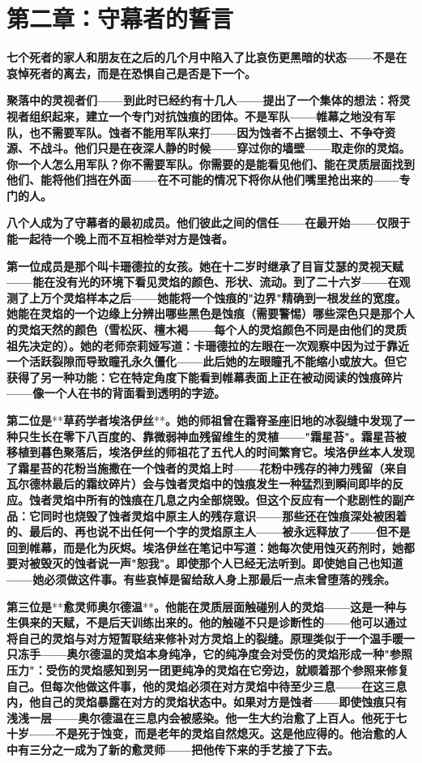 \documentclass[12pt,a4paper,openany]{ctexbook}
\begin{document}
\section*{第二章：守幕者的誓言}


\textbf{七个死者的家人和朋友在之后的几个月中陷入了比哀伤更黑暗的状态——不是在哀悼死者的离去，而是在恐惧自己是否是下一个。}


\textbf{聚落中的灵视者们——到此时已经约有十几人——提出了一个集体的想法：将灵视者组织起来，建立一个专门对抗蚀痕的团体。不是军队——帷幕之地没有军队，也不需要军队。蚀者不能用军队来打——因为蚀者不占据领土、不争夺资源、不战斗。他们只是在夜深人静的时候——穿过你的墙壁——取走你的灵焰。你一个人怎么用军队？你不需要军队。你需要的是能看见他们、能在灵质层面找到他们、能将他们挡在外面——在不可能的情况下将你从他们嘴里抢出来的——专门的人。}


\textbf{八个人成为了守幕者的最初成员。他们彼此之间的信任——在最开始——仅限于能一起待一个晚上而不互相检举对方是蚀者。}


\textbf{第一位成员是那个叫卡珊德拉的女孩。她在十二岁时继承了目盲艾瑟的灵视天赋——能在没有光的环境下看见灵焰的颜色、形状、流动。到了二十六岁——在观测了上万个灵焰样本之后——她能将一个蚀痕的"边界"精确到一根发丝的宽度。她能在灵焰的一个边缘上分辨出哪些黑色是蚀痕（需要警惕）哪些深色只是那个人的灵焰天然的颜色（雪松灰、檀木褐——每个人的灵焰颜色不同是由他们的灵质祖先决定的）。她的老师奈莉娅写道：卡珊德拉的左眼在一次观察中因为过于靠近一个活跃裂隙而导致瞳孔永久僵化——此后她的左眼瞳孔不能缩小或放大。但它获得了另一种功能：它在特定角度下能看到帷幕表面上正在被动阅读的蚀痕碎片——像一个人在书的背面看到透明的字迹。}


\textbf{第二位是}**\textbf{草药学者埃洛伊丝}**\textbf{。她的师祖曾在霜脊圣座旧地的冰裂缝中发现了一种只生长在零下八百度的、靠微弱神血残留维生的灵植——"霜星苔"。霜星苔被移植到暮色聚落后，埃洛伊丝的师祖花了五代人的时间繁育它。埃洛伊丝本人发现了霜星苔的花粉当施撒在一个蚀者的灵焰上时——花粉中残存的神力残留（来自瓦尔德林最后的霜纹碎片）会与蚀者灵焰中的蚀痕发生一种猛烈到瞬间即毕的反应。蚀者灵焰中所有的蚀痕在几息之内全部烧毁。但这个反应有一个悲剧性的副产品：它同时也烧毁了蚀者灵焰中原主人的残存意识——那些还在蚀痕深处被困着的、最后的、再也说不出任何一个字的灵焰原主人——被永远释放了——但不是回到帷幕，而是化为灰烬。埃洛伊丝在笔记中写道：她每次使用蚀灭药剂时，她都要对被毁灭的蚀者说一声"恕我"。即使那个人已经无法听到。即使她自己也知道——她必须做这件事。有些哀悼是留给敌人身上那最后一点未曾堕落的残余。}


\textbf{第三位是}**\textbf{愈灵师奥尔德温}**\textbf{。他能在灵质层面触碰别人的灵焰——这是一种与生俱来的天赋，不是后天训练出来的。他的触碰不只是诊断性的——他可以通过将自己的灵焰与对方短暂联结来修补对方灵焰上的裂缝。原理类似于一个温手暖一只冻手——奥尔德温的灵焰本身纯净，它的纯净度会对受伤的灵焰形成一种"参照压力"：受伤的灵焰感知到另一团更纯净的灵焰在它旁边，就顺着那个参照来修复自己。但每次他做这件事，他的灵焰必须在对方灵焰中待至少三息——在这三息内，他自己的灵焰暴露在对方的灵焰状态中。如果对方是蚀者——即使蚀痕只有浅浅一层——奥尔德温在三息内会被感染。他一生大约治愈了上百人。他死于七十岁——不是死于蚀变，而是老年的灵焰自然熄灭。这是他应得的。他治愈的人中有三分之一成为了新的愈灵师——把他传下来的手艺接了下去。}
\end{document}

